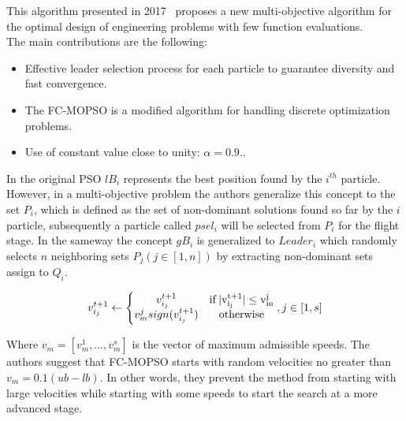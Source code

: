 This algorithm presented in 2017~\cite{mokarram2018new} proposes a new multi-objective algorithm for the optimal design of engineering problems with few function evaluations.\\
The main contributions are the following:
\begin{itemize}
    \item Effective leader selection process for each particle to guarantee diversity and fast convergence.
    \item The FC-MOPSO is a modified algorithm for handling discrete optimization problems.
    \item Use of constant value close to unity: $\alpha = 0.9.$.
\end{itemize}
In the original PSO $lB_i$ represents the best position found by the $i^{th}$ particle. However, in a multi-objective problem the authors generalize this concept to the set $P_i$, which is defined as the set of non-dominant solutions found so far by the $i$ particle, subsequently a particle called $psel_i$ will be selected from $P_i$ for the flight stage. In the sameway the concept $gB_i$ is generalized to $Leader_i$ which randomly selects $n$ neighboring sets $P_j (j\in[1, n])$ by extracting non-dominant sets assign to $Q_i$.

\begin{equation}
    v_{i_j}^{t+1} \leftarrow \left\{  \begin{matrix} v_{i_j}^{t+1} & \rm{ if} \, |v_{i_j}^{t+1}| \leq v_m^j \\ v_m^j sign ( v_{i_j}^{t+1} ) & \rm{otherwise} \end{matrix} \right. , j \in [1,s]
\end{equation}

Where $v_m = [v_m^1, \dots, v_m^s]$ is the vector of maximum admissible speeds. The authors suggest that FC-MOPSO starts with random velocities no greater than $v_{m} = 0.1(ub - lb)$. In other words, they prevent the method from starting with large velocities while starting with some speeds to start the search at a more advanced stage. 



    
    
    
